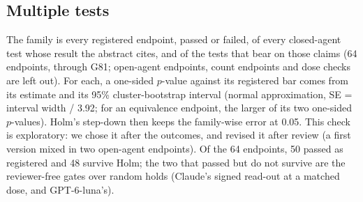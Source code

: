 \subsection*{Multiple tests}
The family is every registered endpoint, passed or failed, of every closed-agent test whose result the abstract cites, and of the tests that bear on those claims (64 endpoints, through G81; open-agent endpoints, count endpoints and dose checks are left out). For each, a one-sided $p$-value against its registered bar comes from its estimate and its 95\% cluster-bootstrap interval (normal approximation, SE = interval width / 3.92; for an equivalence endpoint, the larger of its two one-sided $p$-values). Holm's step-down then keeps the family-wise error at 0.05. This check is exploratory: we chose it after the outcomes, and revised it after review (a first version mixed in two open-agent endpoints). Of the 64 endpoints, 50 passed as registered and 48 survive Holm; the two that passed but do not survive are the reviewer-free gates over random holds (Claude's signed read-out at a matched dose, and GPT-6-luna's).
